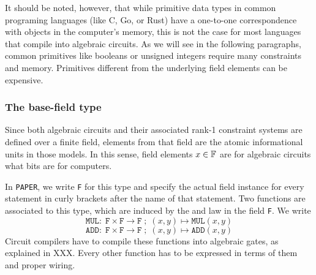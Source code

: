 It should be noted, however, that while primitive data types in common programing languages (like C, Go, or Rust) have a one-to-one correspondence with objects in the computer's memory, this is not the case for most languages that compile into algebraic circuits. As we will see in the following paragraphs, common primitives like booleans or unsigned integers require many constraints and memory. Primitives different from the underlying field elements can be expensive.

\subsubsection{The base-field type} 
Since both algebraic circuits and their associated rank-1 constraint systems are defined over a finite field, elements from that field are the atomic informational units in those models. In this sense, field elements $x\in \mathbb{F}$ are for algebraic circuits what bits are for computers. 

In \texttt{PAPER}, we write \texttt{F} for this type and specify the actual field instance for every statement in curly brackets after the name of that statement. Two functions are associated to this type, which are induced by the  and  law in the field \texttt{F}. We write
\begin{equation}
\mathtt{MUL}:\; \mathtt{F} \times \mathtt{F} \to \mathtt{F}\;;\; (x,y) \mapsto \mathtt{MUL}(x,y)
\end{equation}
\begin{equation}
\mathtt{ADD}:\; \mathtt{F} \times \mathtt{F} \to \mathtt{F}\;;\; (x,y) \mapsto \mathtt{ADD}(x,y)
\end{equation}
Circuit compilers have to compile these functions into algebraic gates, as explained in XXX. Every other function has to be expressed in terms of them and proper wiring.


